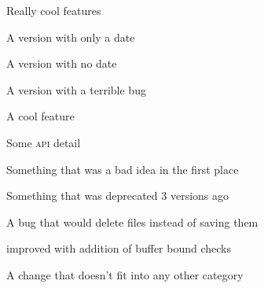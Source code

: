\documentclass{article}
\begin{document}
\begin{changelog}[author=Rebecca Turner,
	sectioncmd=\subsection,
	title=Example changelog]
\begin{version}
\added
	\item Really cool features
\end{version}

\begin{version}[date=2019-01-23, short]
	A version with only a date
\end{version}

\begin{version}[v=1.1.0, simple]
	\item A version with no date
\end{version}

\begin{version}[v=1.0.1, yanked, simple]
	\item A version with a terrible bug
\end{version}

\begin{version}[v=1.0.0, date=2018-10-26]
\added
	\item A cool feature
\changed
	\item Some \textsc{api} detail
\deprecated
	\item Something that was a bad idea in the first place
\removed
	\item Something that was deprecated 3 versions ago
\fixed
	\item A bug that would delete files instead of saving them
\security
	\item improved with addition of buffer bound checks
\misc
	\item A change that doesn't fit into any other category
\end{version}

\end{changelog}
\end{document}
